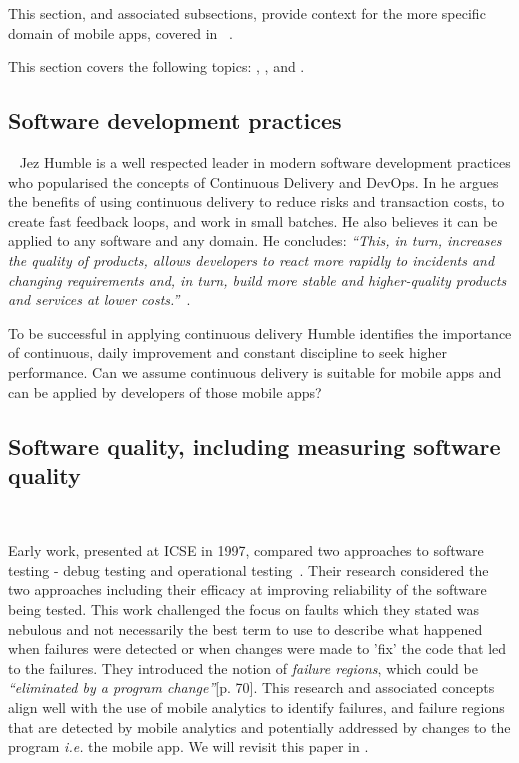 This section, and associated subsections, provide context for the more specific domain of mobile apps, covered in ~.
 
This section covers the following topics: , , and .

\subsection{Software development practices}~\label{rw-software-development-practices-topic}
Jez Humble is a well respected leader in modern software development practices who popularised the concepts of Continuous Delivery and DevOps. In  he argues the benefits of using continuous delivery to reduce risks and transaction costs, to create fast feedback loops, and work in small batches. He also believes it can be applied to any software and any domain. He concludes: \emph{``This, in turn, increases the quality of products, allows developers to react more rapidly to incidents and changing requirements and, in turn, build more stable and higher-quality products and services at lower costs.''}~. 

To be successful in applying continuous delivery Humble identifies the importance of continuous, daily improvement and constant discipline to seek higher performance. Can we assume continuous delivery is suitable for mobile apps and can be applied by developers of those mobile apps? 


\subsection{Software quality, including measuring software quality}~\label{rw-software-quality-including-measurement-topic}

Early work, presented at ICSE in 1997, compared two approaches to software testing - debug testing and operational testing~. Their research considered the two approaches including their efficacy at improving reliability of the software being tested. This work challenged the focus on faults which they stated was nebulous and not necessarily the best term to use to describe what happened when failures were detected or when changes were made to 'fix' the code that led to the failures. They introduced the notion of \emph{failure regions}, which could be \emph{``eliminated by a program change''}[p. 70]. This research and associated concepts align well with the use of mobile analytics to identify failures, and failure regions that are detected by mobile analytics and potentially addressed by changes to the program \emph{i.e.} the mobile app. We will revisit this paper in .

